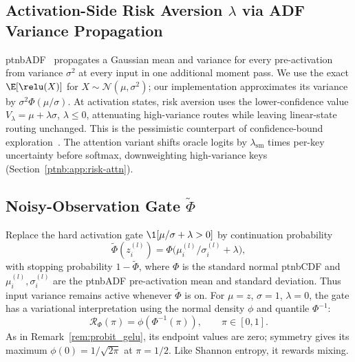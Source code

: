 \subsection{Activation-Side Risk Aversion \texorpdfstring{$\lambda$}{lambda} via ADF Variance Propagation}\label{ptnb:app:adf-variance}

\Ac{ptnbADF}~\parencite{gast2018lightweight} propagates a Gaussian mean and variance for every pre-activation from variance $\sigma^2$ at every input in one additional moment pass. We use the exact
$\E[\relu(X)]$ for $X\sim\mathcal N(\mu,\sigma^2)$; our implementation approximates its variance
by $\sigma^2\Phi(\mu/\sigma)$. At activation states, risk aversion uses the lower-confidence value
$V_\lambda=\mu+\lambda\sigma$, $\lambda\le0$, attenuating high-variance routes while leaving
linear-state routing unchanged. This is the pessimistic counterpart of confidence-bound
exploration~\parencite{auer2002finite,zhang2021risk}. The attention variant shifts oracle logits by
$\lambda_{\mathrm{sm}}$ times per-key uncertainty before softmax, downweighting high-variance keys
(Section~\ref{ptnb:app:risk-attn}).

\subsection{Noisy-Observation Gate \texorpdfstring{$\tilde\Phi$}{Phi}}\label{ptnb:app:noisy-gate-mode}

Replace the hard activation gate $\1[\mu/\sigma+\lambda>0]$ by continuation probability
\begin{equation}\label{ptnb:eq:noisy-gate-defn}
    \tilde\Phi(z_i^{(l)})=\Phi\bigl(\mu_i^{(l)}/\sigma_i^{(l)}+\lambda\bigr),
\end{equation}
with stopping probability $1-\tilde\Phi$, where $\Phi$ is the standard normal \ac{ptnbCDF} and
$\mu_i^{(l)},\sigma_i^{(l)}$ are the \ac{ptnbADF} pre-activation mean and standard deviation.
Thus input variance remains active whenever $\tilde\Phi$ is on. For $\mu=z$, $\sigma=1$,
$\lambda=0$, the gate has a variational interpretation using the normal density $\phi$ and quantile
$\Phi^{-1}$:
\begin{equation}\label{ptnb:eq:noisy-gate-regulariser}
    \mathcal R_\Phi(\pi)=\phi(\Phi^{-1}(\pi)),\qquad \pi\in[0,1].
\end{equation}
As in Remark~\ref{rem:probit_gelu}, its endpoint values are zero; symmetry gives its maximum $\phi(0)=1/\sqrt{2\pi}$ at $\pi=1/2$.
Like Shannon entropy, it rewards mixing.

